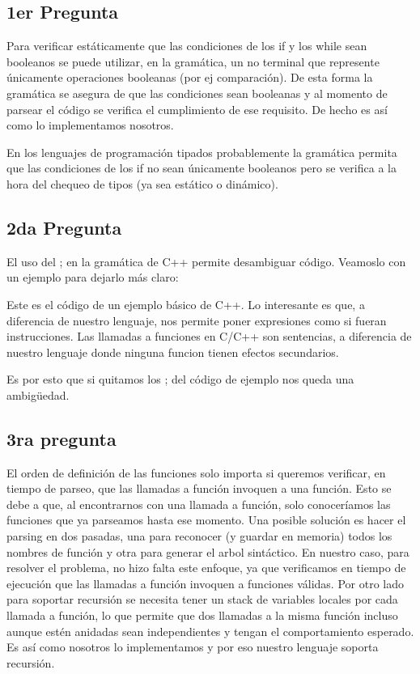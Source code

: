 \subsection{1er Pregunta}

Para verificar estáticamente que las condiciones de los if y los while sean booleanos se puede utilizar, en la gramática, un no terminal que represente únicamente operaciones booleanas (por ej comparación). De esta forma la gramática se asegura de que las condiciones sean booleanas y al momento de parsear el código se verifica el cumplimiento de ese requisito. De hecho es así como lo implementamos nosotros.

En los lenguajes de programación tipados probablemente la gramática permita que las condiciones de los if no sean únicamente booleanos pero se verifica a la hora del chequeo de tipos (ya sea estático o dinámico).

\subsection{2da Pregunta} El uso del ; en la gramática de C++ permite desambiguar código. Veamoslo con un ejemplo para dejarlo más claro:



Este es el código de un ejemplo básico de C++. Lo interesante es que, a diferencia de nuestro lenguaje, nos permite poner expresiones como si fueran instrucciones. Las llamadas a funciones en C/C++ son sentencias, a diferencia de nuestro lenguaje donde ninguna funcion tienen efectos secundarios. 

Es por esto que si quitamos los ; del código de ejemplo nos queda una ambigüedad.

\subsection{3ra pregunta}
El orden de definición de las funciones solo importa si queremos verificar, en tiempo de parseo, que las llamadas a función invoquen a una función. Esto se debe a que, al encontrarnos con una llamada a función, solo conoceríamos las funciones que ya parseamos hasta ese momento. Una posible solución es hacer el parsing en dos pasadas, una para reconocer (y guardar en memoria) todos los nombres de función y otra para generar el arbol sintáctico. En nuestro caso, para resolver el problema, no hizo falta este enfoque, ya que verificamos en tiempo de ejecución que las llamadas a función invoquen a funciones válidas.
Por otro lado para soportar recursión se necesita tener un stack de variables locales por cada llamada a función, lo que permite que dos llamadas a la misma función incluso aunque estén anidadas sean independientes y tengan el comportamiento esperado. Es así como nosotros lo implementamos y por eso nuestro lenguaje soporta recursión.
